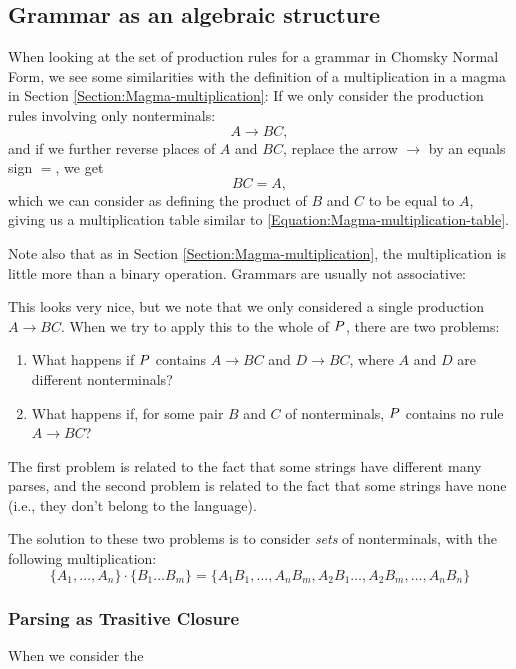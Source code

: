 \subsection{Grammar as an algebraic structure}
When looking at the set of production rules for a grammar in Chomsky Normal Form, we see some similarities with the definition of a multiplication in a magma in Section \ref{Section:Magma-multiplication}:
If we only consider the production rules involving only nonterminals:
\begin{equation*}
  A \to BC,
\end{equation*}
and if we further reverse places of $A$ and $BC$, replace the arrow $\to$ by an equals sign $=$, we get
\begin{equation*}
  BC = A,
\end{equation*}
which we can consider as defining the product of $B$ and $C$ to be equal to $A$, giving us a multiplication table similar to \eqref{Equation:Magma-multiplication-table}.

Note also that as in Section \ref{Section:Magma-multiplication}, the multiplication is little more than a binary operation. Grammars are usually not associative: 

This looks very nice, but we note that we only considered a single production $A \to BC$. When we try to apply this to the whole of $P$, there are two problems:
\begin{enumerate}
\item What happens if $P$ contains $A \to BC$ and $D \to BC$, where $A$ and $D$ are different nonterminals?
\item What happens if, for some pair $B$ and $C$ of nonterminals, $P$ contains no rule $A \to BC$?
\end{enumerate}
The first problem is related to the fact that some strings have different many parses, and the second problem is related to the fact that some strings have none (i.e., they don't belong to the language).

The solution to these two problems is to consider \emph{sets} of nonterminals, with the following multiplication:
\begin{equation*}
  \{A_1, \ldots, A_n \} \cdot \{B_1 \ldots B_m\} = \{A_1B_1, \ldots, A_nB_m, A_2B_1 \ldots, A_2B_m, \ldots, A_nB_n\}
\end{equation*}
\subsubsection{Parsing as Trasitive Closure}

When we consider the 


\label{Section:Magma-multiplication}
